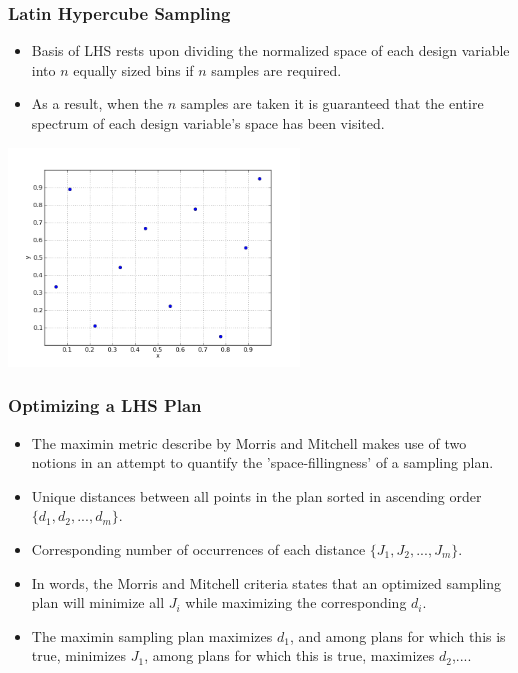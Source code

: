 \begin{frame}
\frametitle{Latin Hypercube Sampling}

\begin{itemize}
  \item Basis of LHS rests upon dividing the normalized space of each design variable into $n$ equally sized bins if $n$ samples are required. 
  \item As a result, when the $n$ samples are taken it is guaranteed that the entire
spectrum of each design variable's space has been visited.  
\end{itemize}
\centering
\includegraphics[width=0.58\textwidth]{./lhs.png}

\end{frame}
\begin{frame}
\frametitle{Optimizing a LHS Plan}

\begin{itemize}
  \item The maximin metric describe by Morris and Mitchell makes use of two notions in an attempt to quantify the 'space-fillingness' of a sampling plan. 
  \item Unique distances between all points in the plan sorted in ascending order $\lbrace d_1, d_2, ..., d_m\rbrace$.
  \item Corresponding number of occurrences of each distance $\lbrace J_1, J_2, ..., J_m\rbrace$.  
  \item In words, the Morris and Mitchell criteria states that an optimized sampling plan will minimize all $J_i$ while maximizing the corresponding $d_i$. 
  \item The maximin sampling plan maximizes $d_1$, and among plans for which this is true, minimizes $J_1$, among plans for which this is true, maximizes $d_2$,....
\end{itemize}

\end{frame}
